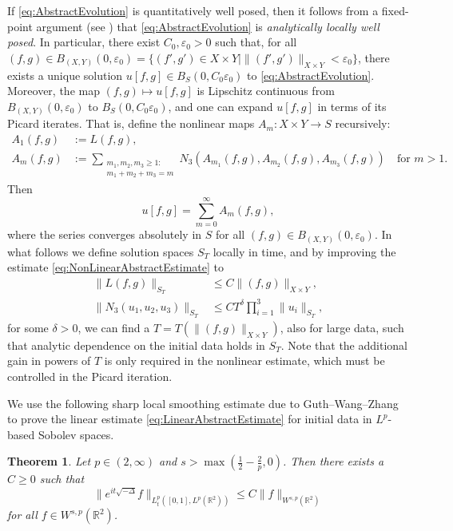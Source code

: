 \documentclass{amsart}
\newtheorem{theorem}{Theorem}[section]
\theoremstyle{definition}
\newcommand{\R}{\mathbb{R}}
\newcommand {\veps}{\varepsilon}
\numberwithin{equation}{section}
\begin{document}
If \eqref{eq:AbstractEvolution} is quantitatively well posed, then it follows from a fixed-point argument (see \cite[Theorem 3]{BejenaruTao2006}) that \eqref{eq:AbstractEvolution} is \emph{analytically locally well posed}. In particular, there exist $C_{0},\veps_{0}>0$ such that, for all $(f,g)\in B_{(X,Y)}(0,\veps_{0})=\{(f',g')\in X\times Y\mid \|(f',g')\|_{X\times Y}<\veps_{0}\}$, there exists a unique solution $u[f,g]\in B_{S}(0,C_{0}\veps_{0})$ to \eqref{eq:AbstractEvolution}. Moreover, the map $(f,g)\mapsto u[f,g]$ is Lipschitz continuous from $B_{(X,Y)}(0,\veps_{0})$ to $B_{S}(0,C_{0}\veps_{0})$, and one can expand $u[f,g]$ in terms of its Picard iterates. That is, define the nonlinear maps $A_m: X \times Y \to S$ recursively:
\begin{equation}\label{eq:Am}
\begin{split}
A_1(f,g) &:= L(f,g), \\
A_m(f,g) &:= \sum_{\substack{ m_1,m_2,m_3 \geq 1: \\ m_1 + m_2 + m_3 = m }} N_3(A_{m_1}(f,g),A_{m_2}(f,g),A_{m_3}(f,g))\quad \text{for } m > 1. 
\end{split}
\end{equation}
Then
\[
u[f,g]=\sum_{m=0}^{\infty}A_{m}(f,g),
\]
where the series converges absolutely in $S$ for all $(f,g)\in B_{(X,Y)}(0,\veps_{0})$. In what follows we define solution spaces $S_{T}$ locally in time, and by improving the estimate \eqref{eq:NonLinearAbstractEstimate} to
\begin{equation}
\label{eq:AbstractEstimatesMod}
\begin{split}
\| L(f,g) \|_{S_T} &\leq C \| (f,g) \|_{X \times Y}, \\
\| N_3(u_1,u_2,u_3) \|_{S_T} &\leq C T^\delta \prod_{i=1}^3 \| u_i \|_{S_T},
\end{split}
\end{equation}
for some $\delta > 0$, we can find a $T=T(\| (f,g) \|_{X \times Y})$, also for large data, such that analytic dependence on the initial data holds in $S_T$. Note that the additional gain in powers of $T$ is only required in the nonlinear estimate, which must be controlled in the Picard iteration.

\medskip

We use the following sharp local smoothing estimate due to Guth--Wang--Zhang \cite{GuthWangZhang2020} to prove the linear estimate \eqref{eq:LinearAbstractEstimate} for initial data in $L^p$-based Sobolev spaces.


\begin{theorem}\label{thm:localsmooth}
Let $p\in(2,\infty)$ and $s > \max( \frac{1}{2} - \frac{2}{p}, 0)$. Then there exists a $C\geq0$ such that
\[
\| e^{it \sqrt{- \Delta}} f \|_{L_t^p([0,1],L^p(\R^2))} \leq C \| f \|_{W^{s,p}(\R^2)}
\]
for all $f\in W^{s,p}(\R^{2})$.
\end{theorem}
\end{document}
